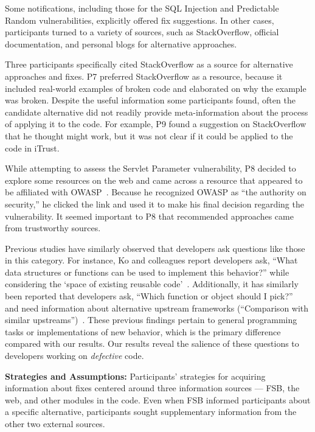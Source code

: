 \documentclass[10pt,journal,compsoc]{IEEEtran}
\begin{document}
Some notifications, including those for the SQL Injection and Predictable Random vulnerabilities, explicitly offered fix suggestions. 
In other cases, participants turned to a variety of sources, such as StackOverflow, official documentation, and personal blogs for alternative approaches.
 
Three participants specifically cited StackOverflow as a source for alternative approaches and fixes.
P7 preferred StackOverflow as a resource, because it included real-world examples of broken code and elaborated on why the example was broken.
Despite the useful information some participants found, often the candidate alternative did not readily provide meta-information about the process of applying it to the code. 
For example, P9 found a suggestion on StackOverflow that he thought might work, but it was not clear if it could be applied to the code in iTrust.

While attempting to assess the Servlet Parameter vulnerability, P8 decided to explore some resources on the web and came across a resource that appeared to be affiliated with OWASP~\cite{OWASP}. 
Because he recognized OWASP as ``the authority on security,'' he clicked the link and used it to make his final decision regarding the vulnerability. 
It seemed important to P8 that recommended approaches came from trustworthy sources.

Previous studies have similarly observed that developers ask questions like those in this category.
For instance, Ko and colleagues report developers ask, ``What data structures or functions can be used to
implement this behavior?'' while considering the `space of existing reusable code'~\cite{Ko:2007:information}.
Additionally, it has similarly been reported that developers ask, ``Which function or object should I pick?''~\cite{latoza2010hard} and need information about alternative upstream frameworks (``Comparison with similar upstreams'')~\cite{haenni2013categorizing}.
These previous findings pertain to general programming tasks or implementations of new behavior, which is the primary difference compared with our results. 
Our results reveal the salience of these questions to developers working on \textit{defective} code.

\textbf{Strategies and Assumptions:}
Participants' strategies for acquiring information about fixes centered around three information sources --- FSB, the web, and other modules in the code. 
Even when FSB informed participants about a specific alternative, participants sought supplementary information from the other two external sources.
\end{document}
